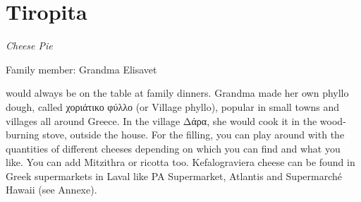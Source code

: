 \chapter{Tiropita}
\label{ch:tiropita}


\textit{Cheese Pie}

Family member: Grandma Elisavet

 would always be on the table at family dinners. Grandma made her own phyllo dough, called \textgreek{χοριάτικο φύλλο} (or Village phyllo), popular in small towns and villages all around Greece. In the village \textgreek{Δάρα}, she would cook it in the wood-burning stove, outside the house. For the filling, you can play around with the quantities of different cheeses depending on which you can find and what you like. You can add Mitzithra or ricotta too. Kefalograviera cheese can be found in Greek supermarkets in Laval like PA Supermarket, Atlantis and Supermarché Hawaii (see Annexe).

